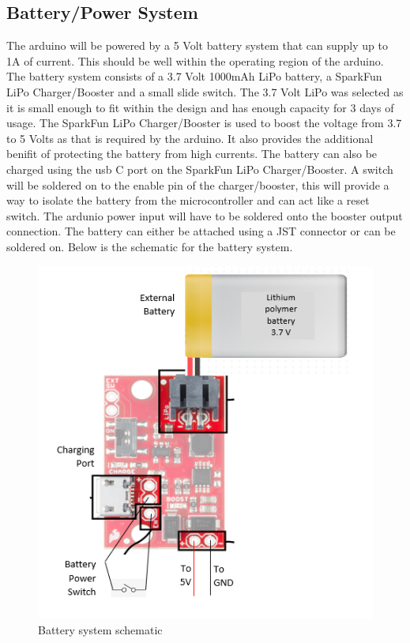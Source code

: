 \documentclass[12pt, titlepage]{article}
\begin{document}
\subsection{Battery/Power System}
The arduino will be powered by a 5 Volt battery system that can supply up to 1A of current. This should be well within the operating region of the arduino. The battery system consists of a 3.7 Volt 1000mAh  LiPo battery, a SparkFun LiPo Charger/Booster and a small slide switch. The 3.7 Volt LiPo was selected as it is small enough to fit within the design and has enough capacity for 3 days of usage. The SparkFun LiPo Charger/Booster is used to boost the voltage from 3.7 to 5 Volts as that is required by the arduino. It also provides the additional benifit of protecting the battery from high currents. The battery can also be charged using the usb C port on the SparkFun LiPo Charger/Booster. A switch will be soldered on to the enable pin of the charger/booster, this will provide a way to isolate the battery from the microcontroller and can act like a reset switch. The ardunio power input will have to be soldered onto the booster output connection. The battery can either be attached using a JST connector or can be soldered on. Below is the schematic for the battery system.   
 \begin{figure}[H]
\centering
  \includegraphics[width=\textwidth,height=\textheight/2,keepaspectratio]{BatterySchematic.png}
  \caption{Battery system schematic}
  \label{batteryschematic} 
\end{figure}
\end{document}
